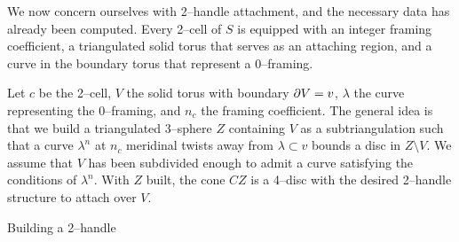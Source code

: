 We now concern ourselves with 2--handle attachment, and the necessary data has already been computed.
Every 2--cell of $S$ is equipped with an integer framing coefficient, a triangulated solid torus that serves as an attaching region, and a curve in the boundary torus that represent a 0--framing.

Let $c$ be the 2--cell, $V$ the solid torus with boundary $\partial V = v$, $\lambda$ the curve representing the 0--framing, and $n_c$ the framing coefficient.
The general idea is that we build a triangulated 3--sphere $Z$ containing $V$ as a subtriangulation such that a curve $\lambda^n$ at $n_c$ meridinal twists away from $\lambda\subset v$ bounds a disc in $Z\setminus V$.
We assume that $V$ has been subdivided enough to admit a curve satisfying the conditions of $\lambda^n$. 
With $Z$ built, the cone $CZ$ is a 4--disc with the desired 2--handle structure to attach over $V$.

\begin{algorithm}
	\caption{Building a 2--handle}
	\label{alg:2handle}
\end{algorithm}